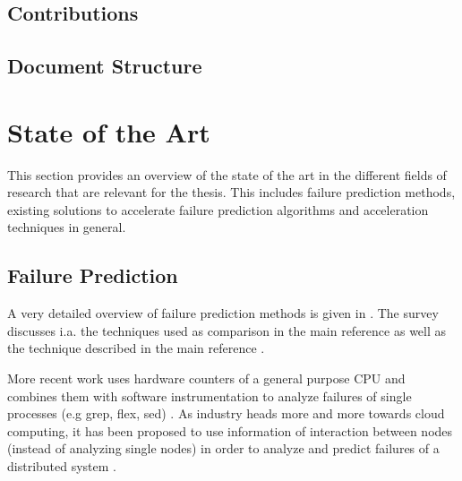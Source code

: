 \documentclass[mscthesis]{usiinfthesis}
\begin{document}
\section{Contributions}
\label{ch:intro_cont}
\section{Document Structure}
\label{ch:intro_struct}

\chapter{State of the Art}
\label{ch:art}
This section provides an overview of the state of the art in the different
fields of research that are relevant for the thesis. This includes failure
prediction methods, existing solutions to accelerate failure prediction
algorithms and acceleration techniques in general.

\section{Failure Prediction}
\label{ch:art_pred}
A very detailed overview of failure prediction methods is given in
\cite{ACM10_Salfner}. The survey discusses i.a. the techniques used as
comparison in the main reference
\cite{lin88,IEEE90_lin,ICDM02_Vilalta,domeniconi02} as well as the technique
described in the main reference \cite{salfner08}.

More recent work uses hardware counters of a general purpose CPU and combines
them with software instrumentation to analyze failures of single processes (e.g
grep, flex, sed) \cite{FSE10_Yilmaz}. As industry heads more and more
towards cloud computing, it has been proposed to use information of interaction
between nodes (instead of analyzing single nodes) in order to analyze and
predict failures of a distributed system \cite{IEEE12_Salfner,DSN10_Oliner}.
\end{document}
